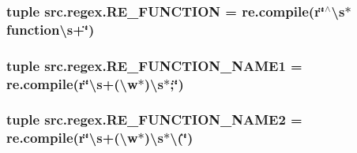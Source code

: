 \hypertarget{namespacesrc_1_1regex_adc990896c4f715969c56f9acad331bcc}{
\subsubsection[{R\-E\-\_\-\-F\-U\-N\-C\-T\-I\-O\-N}]{\setlength{\rightskip}{0pt plus 5cm}tuple src.\-regex.\-R\-E\-\_\-\-F\-U\-N\-C\-T\-I\-O\-N = re.\-compile(r\char`\"{}$^\wedge$\textbackslash{}s$\ast$function\textbackslash{}s+\char`\"{})}}\label{namespacesrc_1_1regex_adc990896c4f715969c56f9acad331bcc}
\hypertarget{namespacesrc_1_1regex_a4d116a57b7d32cc5465b64723bab8315}{
\subsubsection[{R\-E\-\_\-\-F\-U\-N\-C\-T\-I\-O\-N\-\_\-\-N\-A\-M\-E1}]{\setlength{\rightskip}{0pt plus 5cm}tuple src.\-regex.\-R\-E\-\_\-\-F\-U\-N\-C\-T\-I\-O\-N\-\_\-\-N\-A\-M\-E1 = re.\-compile(r\char`\"{}\textbackslash{}s+(\textbackslash{}w$\ast$)\textbackslash{}s$\ast$;\char`\"{})}}\label{namespacesrc_1_1regex_a4d116a57b7d32cc5465b64723bab8315}
\hypertarget{namespacesrc_1_1regex_a3e71207d2a419d805edc4c5793ab835e}{
\subsubsection[{R\-E\-\_\-\-F\-U\-N\-C\-T\-I\-O\-N\-\_\-\-N\-A\-M\-E2}]{\setlength{\rightskip}{0pt plus 5cm}tuple src.\-regex.\-R\-E\-\_\-\-F\-U\-N\-C\-T\-I\-O\-N\-\_\-\-N\-A\-M\-E2 = re.\-compile(r\char`\"{}\textbackslash{}s+(\textbackslash{}w$\ast$)\textbackslash{}s$\ast$\textbackslash{}(\char`\"{})}}\label{namespacesrc_1_1regex_a3e71207d2a419d805edc4c5793ab835e}
